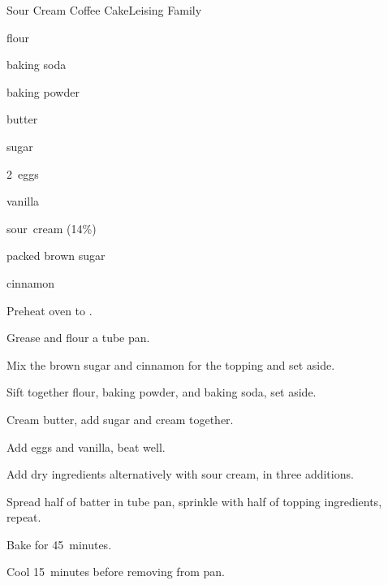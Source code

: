 \begin{recipe}{Sour Cream Coffee Cake}{Leising Family}{}

\begin{ingredients}
\item {} flour
\item {} baking soda
\item {} baking powder
\item \C{\half} butter
\item {} sugar
\item 2~eggs
\item {} vanilla
\item \C{1\threequarter} sour~cream (14\%)
\item \C{\quarter} packed brown sugar
\item \tp{1\half} cinnamon
\end{ingredients}

\begin{directions}
\item Preheat oven to .
\item Grease and flour a  tube pan.
\item Mix the brown sugar and cinnamon for the topping and set aside.
\item Sift together flour, baking powder, and baking soda, set aside.
\item Cream butter, add sugar and cream together.
\item Add eggs and vanilla, beat well.
\item Add dry ingredients alternatively with sour cream, in three additions.
\item Spread half of batter in tube pan, sprinkle with half of topping ingredients, repeat.
\item Bake for 45~minutes.
\item Cool 15~minutes before removing from pan.
\end{directions}
\end{recipe}
